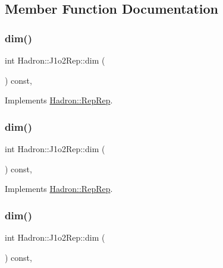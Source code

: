 \subsection{Member Function Documentation}
\mbox{\label{structHadron_1_1J1o2Rep_a2867fb4e13ae7883345606038d6b833b}} 
\subsubsection{\texorpdfstring{dim()}{dim()}\hspace{0.1cm}{\footnotesize\ttfamily [1/5]}}
{\footnotesize\ttfamily int Hadron\+::\+J1o2\+Rep\+::dim (\begin{DoxyParamCaption}{ }\end{DoxyParamCaption}) const\hspace{0.3cm}{\ttfamily [inline]}, {\ttfamily [virtual]}}



Implements \mbox{\hyperlink{structHadron_1_1RepRep_a92c8802e5ed7afd7da43ccfd5b7cd92b}{Hadron\+::\+Rep\+Rep}}.

\mbox{\label{structHadron_1_1J1o2Rep_a2867fb4e13ae7883345606038d6b833b}} 
\subsubsection{\texorpdfstring{dim()}{dim()}\hspace{0.1cm}{\footnotesize\ttfamily [2/5]}}
{\footnotesize\ttfamily int Hadron\+::\+J1o2\+Rep\+::dim (\begin{DoxyParamCaption}{ }\end{DoxyParamCaption}) const\hspace{0.3cm}{\ttfamily [inline]}, {\ttfamily [virtual]}}



Implements \mbox{\hyperlink{structHadron_1_1RepRep_a92c8802e5ed7afd7da43ccfd5b7cd92b}{Hadron\+::\+Rep\+Rep}}.

\mbox{\label{structHadron_1_1J1o2Rep_a2867fb4e13ae7883345606038d6b833b}} 
\subsubsection{\texorpdfstring{dim()}{dim()}\hspace{0.1cm}{\footnotesize\ttfamily [3/5]}}
{\footnotesize\ttfamily int Hadron\+::\+J1o2\+Rep\+::dim (\begin{DoxyParamCaption}{ }\end{DoxyParamCaption}) const\hspace{0.3cm}{\ttfamily [inline]}, {\ttfamily [virtual]}}



